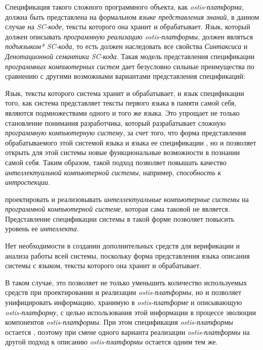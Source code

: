Спецификация такого сложного программного объекта, как \textit{ostis-платформа}, должна быть представлена на формальном \textit{языке представления знаний}, в данном случае на \textit{SC-коде}, тексты которого она хранит и обрабатывает. Язык, который должен описывать \textit{программную реализацию ostis-платформы}, должен являться \textit{подъязыком*} \textit{SC-кода}, то есть должен наследовать все свойства \textit{Синтаксиса} и \textit{Денотационной семантики SC-кода}. Такая модель представления спецификации \textit{программных компьютерных систем} дает безусловно сильные преимущества по сравнению с другими возможными вариантами представления спецификаций:
\begin{textitemize}
    \item Язык, тексты которого система хранит и обрабатывает, и язык спецификации того, как система представляет тексты первого языка в памяти самой себя, являются подмножествами одного и того же языка. Это упрощает не только становление понимания разработчика, который разрабатывает сложную \textit{программную компьютерную систему}, за счет того, что форма представления обрабатываемого этой системой языка и языка ее спецификации , но и позволяет открыть для этой системы новые функциональные возможности в познании самой себя. Таким образом, такой подход позволяет повышать качество \textit{интеллектуальной компьютерной системы}, например, \textit{способность к интроспекции}.
    \item {} проектировать и реализовывать \textit{интеллектуальные компьютерные системы} на \textit{программной компьютерной системе}, которая сама таковой не является. Представление спецификации системы в такой форме позволяет повысить уровень ее \textit{интеллекта}.
    \item Нет необходимости в создании дополнительных средств для верификации и анализа работы всей системы, поскольку форма представления языка описания системы  с языком, тексты которого она хранит и обрабатывает.
\end{textitemize}

В таком случае, это позволяет не только уменьшить количество используемых средств при проектировании и реализации \textit{ostis-платформы}, но и позволяет унифицировать информацию, хранимую в \textit{ostis-платформе} и описывающую \textit{ostis-платформу}, с целью использования этой информации в процессе эволюции компонентов \textit{ostis-платформы}. При этом спецификация \textit{ostis-платформы} остается , поэтому при смене одного варианта реализации \textit{ostis-платформы} на другой подход к описанию \textit{ostis-платформы} остается одним тем же.

